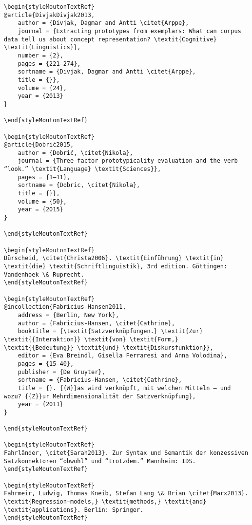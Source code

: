 \begin{styleMoutonHeadingRef}
\begin{verbatim}
\begin{styleMoutonTextRef}
@article{DivjakDivjak2013,
	author = {Divjak, Dagmar and Antti \citet{Arppe},
	journal = {Extracting prototypes from exemplars: What can corpus data tell us about concept representation? \textit{Cognitive} \textit{Linguistics}},
	number = {2},
	pages = {221–274},
	sortname = {Divjak, Dagmar and Antti \citet{Arppe},
	title = {}},
	volume = {24},
	year = {2013}
}

\end{styleMoutonTextRef}

\begin{styleMoutonTextRef}
@article{Dobrić2015,
	author = {Dobrić, \citet{Nikola},
	journal = {Three-factor prototypicality evaluation and the verb “look.” \textit{Language} \textit{Sciences}},
	pages = {1–11},
	sortname = {Dobric, \citet{Nikola},
	title = {}},
	volume = {50},
	year = {2015}
}

\end{styleMoutonTextRef}

\begin{styleMoutonTextRef}
Dürscheid, \citet{Christa2006}. \textit{Einführung} \textit{in} \textit{die} \textit{Schriftlinguistik}, 3rd edition. Göttingen: Vandenhoek \& Ruprecht.
\end{styleMoutonTextRef}

\begin{styleMoutonTextRef}
@incollection{Fabricius-Hansen2011,
	address = {Berlin, New York},
	author = {Fabricius-Hansen, \citet{Cathrine},
	booktitle = {\textit{Satzverknüpfungen.} \textit{Zur} \textit{{Interaktion}} \textit{von} \textit{Form,} \textit{{Bedeutung}} \textit{und} \textit{Diskursfunktion}},
	editor = {Eva Breindl, Gisella Ferraresi and Anna Volodina},
	pages = {15–40},
	publisher = {De Gruyter},
	sortname = {Fabricius-Hansen, \citet{Cathrine},
	title = {}. {{W}}as wird verknüpft, mit welchen Mitteln – und wozu? {{Z}}ur Mehrdimensionalität der Satzverknüpfung},
	year = {2011}
}

\end{styleMoutonTextRef}

\begin{styleMoutonTextRef}
Fahrländer, \citet{Sarah2013}. Zur Syntax und Semantik der konzessiven Satzkonnektoren “obwohl” und “trotzdem.” Mannheim: IDS.
\end{styleMoutonTextRef}

\begin{styleMoutonTextRef}
Fahrmeir, Ludwig, Thomas Kneib, Stefan Lang \& Brian \citet{Marx2013}. \textit{Regression—models,} \textit{methods,} \textit{and} \textit{applications}. Berlin: Springer.
\end{styleMoutonTextRef}


\end{verbatim}
\end{styleMoutonHeadingRef}
